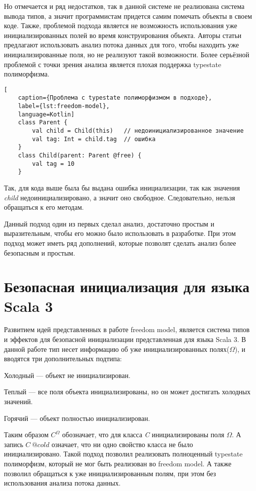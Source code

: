 Но отмечается и ряд недостатков, так в данной системе не реализована система вывода типов,
а значит программистам придется самим помечать объекты в своем коде.
Также, проблемой подхода является не возможность использования уже инициализированных полей во время конструирования объекта.
Авторы статьи предлагают использовать анализ потока данных для того, чтобы находить уже инициализированные поля,
но не реализуют такой возможности.
Более серьёзной проблемой с точки зрения анализа является плохая поддержка typestate полиморфизма.
\begin{lstlisting}[
    caption={Проблема c typestate полиморфизмом в подходе},
    label={lst:freedom-model},
    language=Kotlin]
    class Parent {
        val child = Child(this)   // недоинициализированное значение
        val tag: Int = child.tag  // ошибка
    }
    class Child(parent: Parent @free) {
        val tag = 10
    }
\end{lstlisting}
Так, для кода выше была бы выдана ошибка инициализации, так как значения \emph{child} недоинициализировано,
а значит оно свободное.
Следовательно, нельзя обращаться к его методам.

Данный подход один из первых сделал анализ, достаточно простым и выразительным, чтобы его можно было использовать в разработке.
При этом подход может иметь ряд дополнений, которые позволят сделать анализ более безопасным и простым.

\section{Безопасная инициализация для языка Scala 3}\label{sec:безопасная-инициализация-для-языка-scala-3}

Развитием идей представленных в работе freedom model,
является система типов и эффектов для безопасной инициализации представленная для языка Scala 3\cite{safe-initialization-for-scala}.
В данной работе тип несет информацию об уже инициализированных полях($\Omega$), и вводятся три дополнительных подтипа:
\begin{itemize*}
    \item Холодный --- объект не инициализирован.
    \item Теплый --- все поля объекта инициализированы, но он может достигать холодных значений.
    \item Горячий --- объект полностью инициализирован.
\end{itemize*}
Таким образом $C^\Omega$ обозначает, что для класса \emph{C} инициализированы поля $\Omega$.
А запись $C~@cold$ означает, что ни одно свойство класса не было инициализировано.
Такой подход позволил реализовать полноценный typestate полиморфизм, который не мог быть реализован во freedom model.
А также позволил обращаться к уже инициализированным полям, при этом без использования анализа потока данных.

